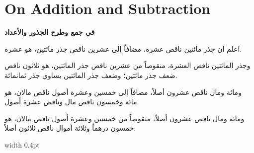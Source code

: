 \documentclass[11pt,a4paper,openany,oneside]{book}
\begin{document}
\newpage

\chapter{On Addition and Subtraction}
\label{ch:addition}

\noindent\begin{minipage}[t]{0.48\textwidth}
\raggedleft

\begin{Arabic}
\textbf{في جمع وطرح الجذور والأعداد}

اعلم أن جذر مائتين ناقص عشرة، مضافاً إلى عشرين ناقص جذر مائتين، هو عشرة.

وجذر المائتين ناقص العشرة، منقوصاً من عشرين ناقص جذر المائتين، هو ثلاثون ناقص ضعف جذر مائتين؛ وضعف جذر المائتين يساوي جذر ثمانمائة.

ومائة ومال ناقص عشرون أصلاً، مضافاً إلى خمسين وعشرة أصول ناقص مالان، هو مائة وخمسون ناقص مال وناقص عشرة أصول.

ومائة ومال ناقص عشرون أصلاً، منقوصاً من خمسين وعشرة أصول ناقص مالان، هو خمسون درهماً وثلاثة أموال ناقص ثلاثون أصلاً.
\end{Arabic}

\end{minipage}%
\hfill\vrule width 0.4pt\hfill
\end{document}
